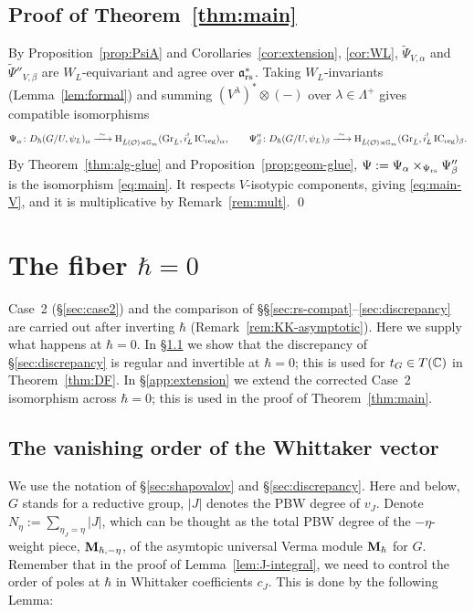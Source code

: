 \documentclass{article}
\theoremstyle{plain}
\theoremstyle{definition}
\theoremstyle{remark}
\numberwithin{equation}{section}
\begin{document}
\subsection{Proof of Theorem~\ref{thm:main}}\label{sec:proof-main}
By Proposition~\ref{prop:PsiA} and Corollaries~\ref{cor:extension}, \ref{cor:WL}, $\widetilde\Psi_{V,\alpha}$ and $\widetilde\Psi''_{V,\beta}$ are $W_L$-equivariant and agree over $\mathfrak{a}^*_{\mathrm{rs}}$. Taking $W_L$-invariants (Lemma~\ref{lem:formal}) and summing $(V^\lambda)^*\otimes(-)$ over $\lambda\in\Lambda^+$ gives compatible isomorphisms
\[
\Psi_\alpha\colon\Dh(G/U,\psiL)_\alpha\xrightarrow{\ \sim\ }\H_{\LO}(\GrL,i_L^!\IC_\reg)_\alpha,\qquad
\Psi''_\beta\colon\Dh(G/U,\psiL)_\beta\xrightarrow{\ \sim\ }\H_{\LO}(\GrL,i_L^!\IC_\reg)_\beta .
\]
By Theorem~\ref{thm:alg-glue} and Proposition~\ref{prop:geom-glue}, $\Psi:=\Psi_\alpha\times_{\Psi_{\mathrm{rs}}}\Psi''_\beta$ is the isomorphism \eqref{eq:main}. It respects $V$-isotypic components, giving \eqref{eq:main-V}, and it is multiplicative by Remark~\ref{rem:mult}. \qed

\appendix
\section{The fiber \texorpdfstring{$\hbar=0$}{hbar=0}}\label{app:hbar0}
Case~2 (\S\ref{sec:case2}) and the comparison of \S\S\ref{sec:rs-compat}--\ref{sec:discrepancy} are carried out after inverting $\hbar$ (Remark~\ref{rem:KK-asymptotic}). Here we supply what happens at $\hbar=0$. In \S\ref{app:integrality} we show that the discrepancy of \S\ref{sec:discrepancy} is regular and invertible at $\hbar=0$; this is used for $t_G\in T(\mathbb{C})$ in Theorem~\ref{thm:DF}. In \S\ref{app:extension} we extend the corrected Case~2 isomorphism across $\hbar=0$; this is used in the proof of Theorem~\ref{thm:main}.

\subsection{The vanishing order of the Whittaker vector}\label{app:integrality}
We use the notation of \S\ref{sec:shapovalov} and \S\ref{sec:discrepancy}. Here and below, $G$ stands for a reductive group, $|J|$ denotes the PBW degree of $v_J$. Denote $N_\eta:=\sum_{\eta_J=\eta}|J|$, which can be thought as the total PBW degree of the $-\eta$-weight piece, $\mathbf{M}_{\hbar,-\eta}$, of the asymtopic universal Verma module $\mathbf{M}_\hbar$ for $G$. Remember that in the proof of Lemma~\ref{lem:J-integral}, we need to control the order of poles at $\hbar$ in Whittaker coefficients $c_J$. This is done by the following Lemma:
\end{document}
